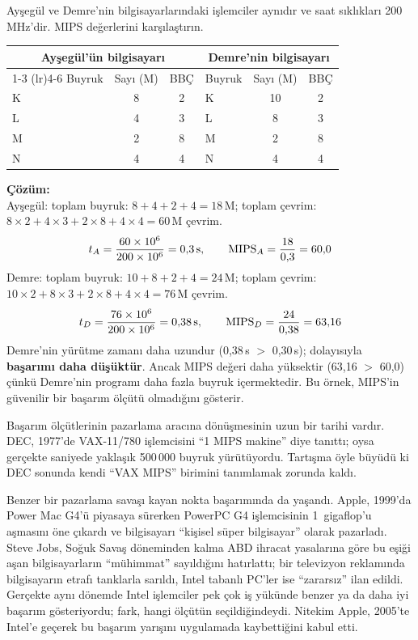\begin{ornek}[2.5]
Ayşegül ve Demre'nin bilgisayarlarındaki işlemciler aynıdır ve saat sıklıkları 200\,MHz'dir. MIPS değerlerini karşılaştırın.

\begin{center}
\begin{tabular}{lcclcc}
\toprule
\multicolumn{3}{c}{\textbf{Ayşegül'ün bilgisayarı}} & \multicolumn{3}{c}{\textbf{Demre'nin bilgisayarı}} \\
\cmidrule(lr){1-3} \cmidrule(lr){4-6}
Buyruk & Sayı (M) & BBÇ & Buyruk & Sayı (M) & BBÇ \\
\midrule
K & 8  & 2 & K & 10 & 2 \\
L & 4  & 3 & L & 8  & 3 \\
M & 2  & 8 & M & 2  & 8 \\
N & 4  & 4 & N & 4  & 4 \\
\bottomrule
\end{tabular}
\end{center}

\textbf{Çözüm:}\\
Ayşegül: toplam buyruk: $8+4+2+4 = 18$\,M; toplam çevrim: $8 \times 2 + 4 \times 3 + 2 \times 8 + 4 \times 4 = 60$\,M çevrim.
\[
t_A = \frac{60 \times 10^6}{200 \times 10^6} = 0{,}3 \text{\,s}, \qquad \text{MIPS}_A = \frac{18}{0{,}3} = 60{,}0
\]
Demre: toplam buyruk: $10+8+2+4 = 24$\,M; toplam çevrim: $10 \times 2 + 8 \times 3 + 2 \times 8 + 4 \times 4 = 76$\,M çevrim.
\[
t_D = \frac{76 \times 10^6}{200 \times 10^6} = 0{,}38 \text{\,s}, \qquad \text{MIPS}_D = \frac{24}{0{,}38} = 63{,}16
\]
Demre'nin yürütme zamanı daha uzundur (0,38\,s $>$ 0,30\,s); dolayısıyla \textbf{başarımı daha düşüktür}. Ancak MIPS değeri daha yüksektir (63,16 $>$ 60,0) çünkü Demre'nin programı daha fazla buyruk içermektedir. Bu örnek, MIPS'in güvenilir bir başarım ölçütü olmadığını gösterir.
\end{ornek}

\begin{bilginot}
Başarım ölçütlerinin pazarlama aracına dönüşmesinin uzun bir tarihi vardır. DEC, 1977'de VAX-11/780 işlemcisini ``1 MIPS makine'' diye tanıttı; oysa gerçekte saniyede yaklaşık 500\,000 buyruk yürütüyordu. Tartışma öyle büyüdü ki DEC sonunda kendi ``VAX MIPS'' birimini tanımlamak zorunda kaldı.

Benzer bir pazarlama savaşı kayan nokta başarımında da yaşandı. Apple, 1999'da Power Mac G4'ü piyasaya sürerken PowerPC G4 işlemcisinin 1~gigaflop'u aşmasını öne çıkardı ve bilgisayarı ``kişisel süper bilgisayar'' olarak pazarladı. Steve Jobs, Soğuk Savaş döneminden kalma ABD ihracat yasalarına göre bu eşiği aşan bilgisayarların ``mühimmat'' sayıldığını hatırlattı; bir televizyon reklamında bilgisayarın etrafı tanklarla sarıldı, Intel tabanlı PC'ler ise ``zararsız'' ilan edildi. Gerçekte aynı dönemde Intel işlemciler pek çok iş yükünde benzer ya da daha iyi başarım gösteriyordu; fark, hangi ölçütün seçildiğindeydi. Nitekim Apple, 2005'te Intel'e geçerek bu başarım yarışını uygulamada kaybettiğini kabul etti.
\end{bilginot}

